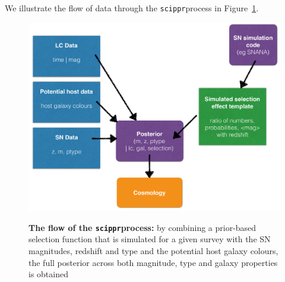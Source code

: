 \documentclass[12pt, onecolumn]{emulateapj}
\newcommand{\scippr}{\texttt{scippr}}
\begin{document}
We illustrate the flow of data through the \scippr process in Figure~\ref{fig:flow1}.
\begin{figure}
\begin{center}
\includegraphics[width=1.0\textwidth]{fig/Schematic_Hlozek.pdf}\\




\caption{{\bf The flow of the \scippr process:} by combining a prior-based selection function that is simulated for a given survey with the SN magnitudes, redshift and type and the potential host galaxy colours, the full posterior across both magnitude, type and galaxy properties is obtained 
\label{fig:flow1}}
\end{center}
\end{figure}
\end{document}
